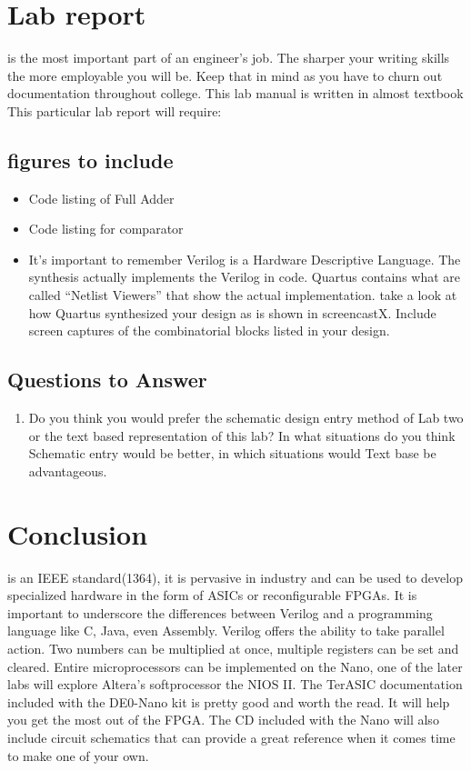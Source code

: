   \section{Lab report}
     is the most important part of an engineer's job. The sharper your writing skills the more employable you will be. Keep that in mind as you have to churn out documentation throughout college. This lab manual is written in almost textbook This particular lab report will require:
    \subsection{figures to include}
    \begin{itemize}
      \item Code listing of Full Adder
      \item Code listing for comparator
      \item It's important to remember Verilog is a Hardware Descriptive Language. The synthesis actually implements the Verilog in code. Quartus contains what are called ``Netlist Viewers'' that show the actual implementation. take a look at how Quartus synthesized your design as is shown in screencastX. Include screen captures of the combinatorial blocks listed in your design.
    \end{itemize}

    \subsection{Questions to Answer}
      \begin{enumerate}
        \item Do you think you would prefer the schematic design entry method of Lab two or the text based representation of this lab? In what situations do you think Schematic entry would be better, in which situations would Text base be advantageous.
      \end{enumerate}

  \section{Conclusion}
     is an IEEE standard(1364)\cite{Wikipedia:Verilog}, it is pervasive in industry and can be used to develop specialized hardware in the form of ASICs or reconfigurable FPGAs. It is important to underscore the differences between Verilog and a programming language like C, Java, even Assembly. Verilog offers the ability to take parallel action. Two numbers can be multiplied at once, multiple registers can be set and cleared. Entire microprocessors can be implemented on the Nano, one of the later labs will explore Altera's softprocessor the NIOS II. The TerASIC documentation included with the DE0-Nano kit is pretty good and worth the read. It will help you get the most out of the FPGA. The CD included with the Nano will also include circuit schematics that can provide a great reference when it comes time to make one of your own.

